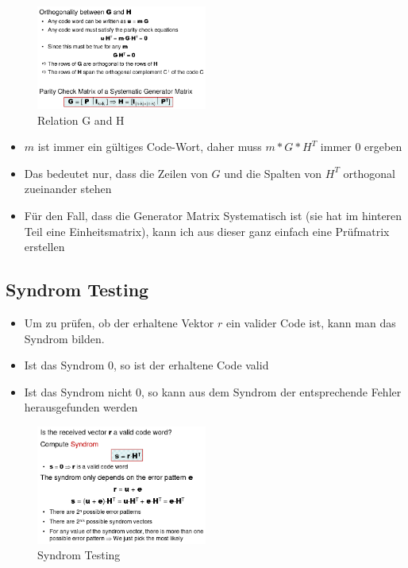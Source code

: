 \begin{figure}[H]
\centering
\includegraphics[width=0.5\textwidth]{figures/BeziehungGundH.png}
\caption{Relation G and H}
\end{figure}

\begin{itemize}
\tightlist
\item
  $m$ ist immer ein gültiges Code-Wort, daher muss $m*G*H^T$ immer 0
  ergeben
\item
  Das bedeutet nur, dass die Zeilen von $G$ und die Spalten von $H^T$
  orthogonal zueinander stehen
\item
  Für den Fall, dass die Generator Matrix Systematisch ist (sie hat im
  hinteren Teil eine Einheitsmatrix), kann ich aus dieser ganz einfach
  eine Prüfmatrix erstellen
\end{itemize}

\hypertarget{syndrom-testing}{%
\subsection{Syndrom Testing}\label{syndrom-testing}}

\begin{itemize}
\tightlist
\item
  Um zu prüfen, ob der erhaltene Vektor $r$ ein valider Code ist, kann man das Syndrom bilden.
\item
  Ist das Syndrom $0$, so ist der erhaltene Code valid
\item
  Ist das Syndrom nicht $0$, so kann aus dem Syndrom der entsprechende
  Fehler herausgefunden werden
\end{itemize}

\begin{figure}[H]
\centering
\includegraphics[width=0.5\textwidth]{figures/syndromTesting.png}
\caption{Syndrom Testing}
\end{figure}

